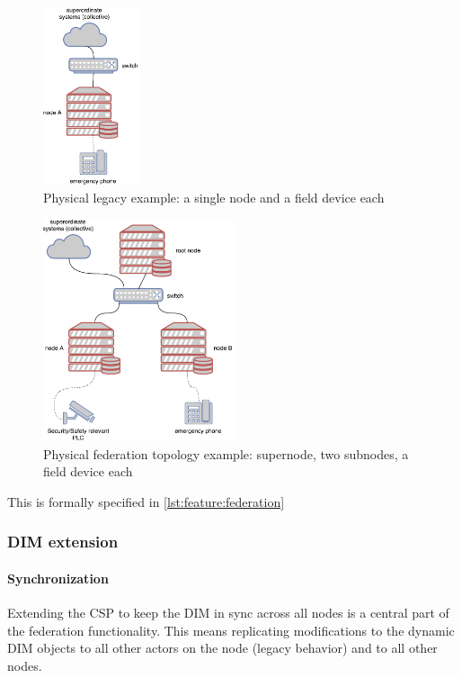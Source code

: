 \begin{figure}[]
	\center
	\includegraphics[width=0.25\textwidth]{img/topo_sl_noha.pdf}
	\caption{Physical legacy example: a single node and a field device each}
	\label{fig:topo:sl:noha}
\end{figure}
\begin{figure}[]
	\center
	\includegraphics[width=0.5\textwidth]{img/topo_ml_noha.pdf}
	\caption{Physical federation topology example: supernode, two subnodes, a field device each}
	\label{fig:topo:ml:noha}
\end{figure}

This is formally specified in \autoref{lst:feature:federation}


\subsubsection{DIM extension}

\paragraph{Synchronization}
Extending the \gls{CSP} to keep the \gls{DIM} in sync across all nodes is a central
part of the federation functionality. This means replicating modifications to
the dynamic DIM objects to all other actors on the node (legacy behavior) and
to all other nodes.

